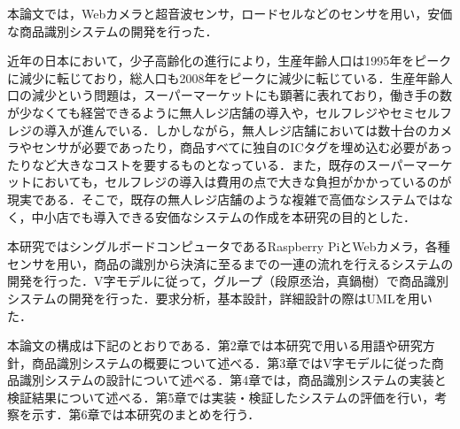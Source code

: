 


本論文では，Webカメラと超音波センサ，ロードセルなどのセンサを用い，安価な商品識別システムの開発を行った．

近年の日本において，少子高齢化の進行により，生産年齢人口は1995年をピークに減少に転じており，総人口も2008年をピークに減少に転じている\cite{population}．生産年齢人口の減少という問題は，スーパーマーケットにも顕著に表れており，働き手の数が少なくても経営できるように無人レジ店舗の導入や，セルフレジやセミセルフレジの導入が進んでいる．しかしながら，無人レジ店舗においては数十台のカメラやセンサが必要であったり，商品すべてに独自のICタグを埋め込む必要があったりなど大きなコストを要するものとなっている．また，既存のスーパーマーケットにおいても，セルフレジの導入は費用の点で大きな負担がかかっているのが現実である．そこで，既存の無人レジ店舗のような複雑で高価なシステムではなく，中小店でも導入できる安価なシステムの作成を本研究の目的とした．

本研究ではシングルボードコンピュータであるRaspberry PiとWebカメラ，各種センサを用い，商品の識別から決済に至るまでの一連の流れを行えるシステムの開発を行った．V字モデルに従って，グループ（段原丞治，真鍋樹）で商品識別システムの開発を行った．要求分析，基本設計，詳細設計の際はUMLを用いた．

本論文の構成は下記のとおりである．第2章では本研究で用いる用語や研究方針，商品識別システムの概要について述べる．第3章ではV字モデルに従った商品識別システムの設計について述べる．第4章では，商品識別システムの実装と検証結果について述べる．第5章では実装・検証したシステムの評価を行い，考察を示す．第6章では本研究のまとめを行う．